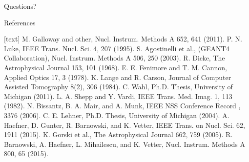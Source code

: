 \documentclass[xcolor=x11names,compress]{beamer}
\renewcommand{\(}{\begin{columns}}
\renewcommand{\)}{\end{columns}}
\newcommand{\<}[1]{\begin{column}{#1}}
\renewcommand{\>}{\end{column}}
\begin{document}
\begin{frame}[plain,c]
\begin{center}
\Large Questions?
\end{center}
\end{frame}


\begin{frame}{References}    
\tiny
  \begin{thebibliography}{10}    
  [text]
   M. Galloway and other, Nucl. Instrum. Methods A 652, 641 (2011).
   P. N. Luke, IEEE Trans. Nucl. Sci. 4, 207 (1995).
   S. Agostinelli et al., (GEANT4 Collaboration), Nucl. Instrum. Methods A 506, 250 (2003).
   R. Dicke, The Astrophysical Journal 153, 101 (1968).
   E. E. Fenimore and T. M. Cannon, Applied Optics 17, 3 (1978).
   K. Lange and R. Carson, Journal of Computer Assisted Tomography 8(2), 306 (1984).
   C. Wahl, Ph.D. Thesis, University of Michigan (2011).
   L. A. Shepp and Y. Vardi, IEEE Trans. Med. Imag. 1, 113 (1982).
   N. Bissantz, B. A. Mair, and A. Munk, IEEE NSS Conference Record , 3376 (2006).
   C. E. Lehner, Ph.D. Thesis, University of Michigan (2004).
   A. Haefner, D. Gunter, R. Barnowski, and K. Vetter, IEEE Trans. on Nucl. Sci. 62, 1911 (2015).
   K. Gorski et al., The Astrophysical Journal 662, 759 (2005).
   R. Barnowski, A. Haefner, L. Mihailescu, and K. Vetter, Nucl. Instrum. Methods A 800, 65 (2015).
  \end{thebibliography}
\end{frame}
\end{document}
